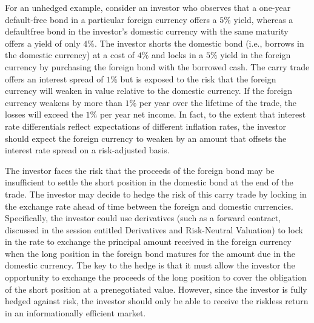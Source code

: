 \documentclass[11pt]{article}
\begin{document}
For an unhedged example, consider an investor who observes that a one-year default-free bond in a particular foreign currency offers a $5 \%$ yield, whereas a defaultfree bond in the investor's domestic currency with the same maturity offers a yield of only $4 \%$. The investor shorts the domestic bond (i.e., borrows in the domestic currency) at a cost of $4 \%$ and locks in a $5 \%$ yield in the foreign currency by purchasing the foreign bond with the borrowed cash. The carry trade offers an interest spread of $1 \%$ but is exposed to the risk that the foreign currency will weaken in value relative to the domestic currency. If the foreign currency weakens by more than $1 \%$ per year over the lifetime of the trade, the losses will exceed the $1 \%$ per year net income. In fact, to the extent that interest rate differentials reflect expectations of different inflation rates, the investor should expect the foreign currency to weaken by an amount that offsets the interest rate spread on a risk-adjusted basis.

The investor faces the risk that the proceeds of the foreign bond may be insufficient to settle the short position in the domestic bond at the end of the trade. The investor may decide to hedge the risk of this carry trade by locking in the exchange rate ahead of time between the foreign and domestic currencies. Specifically, the investor could use derivatives (such as a forward contract, discussed in the session entitled Derivatives and Risk-Neutral Valuation) to lock in the rate to exchange the principal amount received in the foreign currency when the long position in the foreign bond matures for the amount due in the domestic currency. The key to the hedge is that it must allow the investor the opportunity to exchange the proceeds of the long position to cover the obligation of the short position at a prenegotiated value. However, since the investor is fully hedged against risk, the investor should only be able to receive the riskless return in an informationally efficient market.
\end{document}
